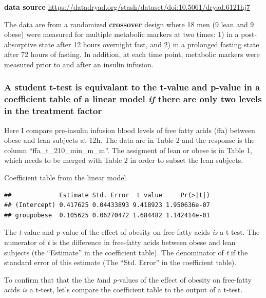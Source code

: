 \documentclass[]{book}
\begin{document}
\textbf{data source} \url{https://datadryad.org/stash/dataset/doi:10.5061/dryad.6121hj7}

The data are from a randomized \textbf{crossover} design where 18 men (9 lean and 9 obese) were measured for multiple metabolic markers at two times: 1) in a post-absorptive state after 12 hours overnight fast, and 2) in a prolonged fasting state after 72 hours of fasting. In addition, at each time point, metabolic markers were measured prior to and after an insulin infusion.

\hypertarget{a-student-t-test-is-equivalant-to-the-t-value-and-p-value-in-a-coefficient-table-of-a-linear-model-if-there-are-only-two-levels-in-the-treatment-factor}{%
\subsubsection{\texorpdfstring{A student t-test is equivalant to the t-value and p-value in a coefficient table of a linear model \emph{if} there are only two levels in the treatment factor}{A student t-test is equivalant to the t-value and p-value in a coefficient table of a linear model if there are only two levels in the treatment factor}}\label{a-student-t-test-is-equivalant-to-the-t-value-and-p-value-in-a-coefficient-table-of-a-linear-model-if-there-are-only-two-levels-in-the-treatment-factor}}

Here I compare pre-insulin infusion blood levels of free fatty acids (ffa) between obese and lean subjects at 12h. The data are in Table 2 and the response is the column ``ffa\_t\_210\_min\_m\_m''. The assigment of lean or obese is in Table 1, which needs to be merged with Table 2 in order to subset the lean subjects.

Coefficient table from the linear model

\begin{verbatim}
##             Estimate Std. Error  t value     Pr(>|t|)
## (Intercept) 0.417625 0.04433893 9.418923 1.950636e-07
## groupobese  0.105625 0.06270472 1.684482 1.142414e-01
\end{verbatim}

The \emph{t}-value and \emph{p}-value of the effect of obesity on free-fatty acids \emph{is} a t-test. The numerator of \emph{t} is the difference in free-fatty acids between obese and lean subjects (the ``Estimate'' in the coefficient table). The denominator of \emph{t} if the standard error of this estimate (The ``Std. Error'' in the coefficient table).

To confirm that that the the \emph{t}and \emph{p}-values of the effect of obesity on free-fatty acids \emph{is} a t-test, let's compare the coefficient table to the output of a t-test.
\end{document}
